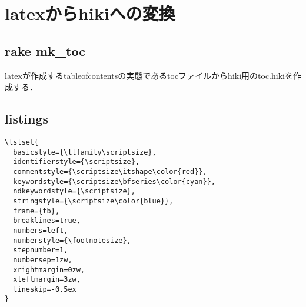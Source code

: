 \section{latexからhikiへの変換}
\subsection{rake mk\_toc}
latexが作成するtableofcontentsの実態であるtocファイルからhiki用のtoc.hikiを作成する．

\subsection{listings}\begin{lstlisting}[style=customTeX,basicstyle={\scriptsize\ttfamily}]
\lstset{
  basicstyle={\ttfamily\scriptsize},
  identifierstyle={\scriptsize},
  commentstyle={\scriptsize\itshape\color{red}},
  keywordstyle={\scriptsize\bfseries\color{cyan}},
  ndkeywordstyle={\scriptsize},
  stringstyle={\scriptsize\color{blue}},
  frame={tb},
  breaklines=true,
  numbers=left,
  numberstyle={\footnotesize},
  stepnumber=1,
  numbersep=1zw,
  xrightmargin=0zw,
  xleftmargin=3zw,
  lineskip=-0.5ex
}
\end{lstlisting}
